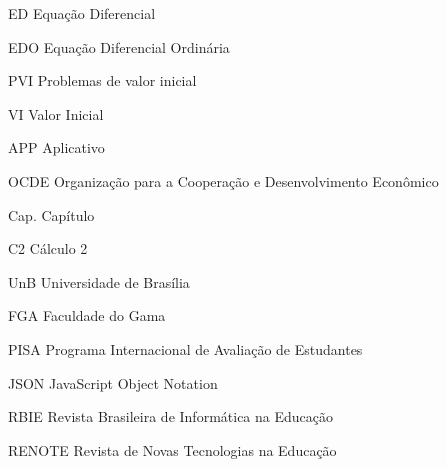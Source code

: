 \begin{siglas}
  \item[ED] Equação Diferencial
  \item[EDO] Equação Diferencial Ordinária
  \item[PVI] Problemas de valor inicial
  \item[VI] Valor Inicial
  \item[APP] Aplicativo
  \item[OCDE] Organização para a Cooperação e Desenvolvimento Econômico
  \item[Cap.] Capítulo
  \item[C2] Cálculo 2
  \item[UnB] Universidade de Brasília
  \item[FGA] Faculdade do Gama
  \item[PISA] Programa Internacional de Avaliação de Estudantes
  \item[JSON] JavaScript Object Notation
  \item[RBIE] Revista Brasileira de Informática na Educação
  \item[RENOTE] Revista de Novas Tecnologias na Educação
\end{siglas}
